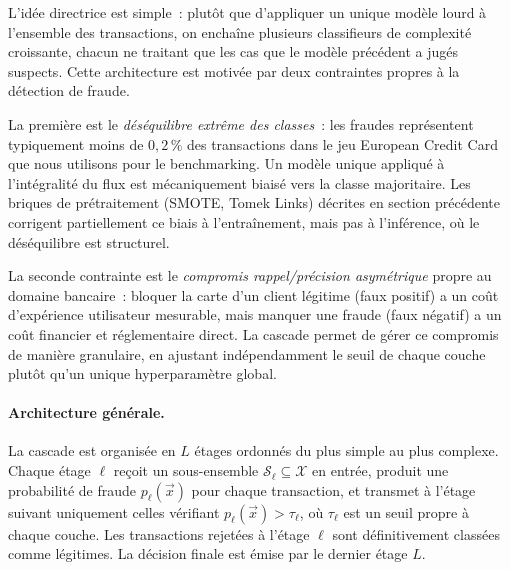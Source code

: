 \documentclass[a4paper]{article}
\begin{document}
L'idée directrice est simple~: plutôt que d'appliquer un unique modèle lourd à l'ensemble des transactions, on enchaîne plusieurs classifieurs de complexité croissante, chacun ne traitant que les cas que le modèle précédent a jugés suspects. Cette architecture est motivée par deux contraintes propres à la détection de fraude.
 
La première est le \emph{déséquilibre extrême des classes}~: les fraudes représentent typiquement moins de $0{,}2\,\%$ des transactions dans le jeu European Credit Card que nous utilisons pour le benchmarking. Un modèle unique appliqué à l'intégralité du flux est mécaniquement biaisé vers la classe majoritaire. Les briques de prétraitement (SMOTE, Tomek Links) décrites en section précédente corrigent partiellement ce biais à l'entraînement, mais pas à l'inférence, où le déséquilibre est structurel.
 
La seconde contrainte est le \emph{compromis rappel/précision asymétrique} propre au domaine bancaire~: bloquer la carte d'un client légitime (faux positif) a un coût d'expérience utilisateur mesurable, mais manquer une fraude (faux négatif) a un coût financier et réglementaire direct. La cascade permet de gérer ce compromis de manière granulaire, en ajustant indépendamment le seuil de chaque couche plutôt qu'un unique hyperparamètre global.
 
\paragraph{Architecture générale.} La cascade est organisée en $L$ étages ordonnés du plus simple au plus complexe. Chaque étage $\ell$ reçoit un sous-ensemble $\mathcal{S}_\ell \subseteq \mathcal{X}$ en entrée, produit une probabilité de fraude $p_\ell(\vec{x})$ pour chaque transaction, et transmet à l'étage suivant uniquement celles vérifiant $p_\ell(\vec{x}) > \tau_\ell$, où $\tau_\ell$ est un seuil propre à chaque couche. Les transactions rejetées à l'étage $\ell$ sont définitivement classées comme légitimes. La décision finale est émise par le dernier étage $L$.
 
\end{document}
